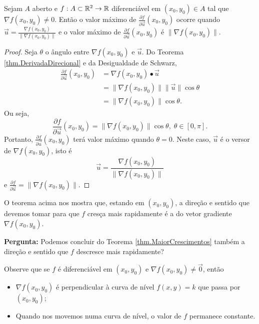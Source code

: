 \begin{theorem}\label{thm.MaiorCrescimentos}
    Sejam \(A\) aberto e \(f: A \subset \mathbb{R}^2 \to \mathbb{R}\) diferenciável em \((x_0,y_0)\in A\) tal que \(\nabla f(x_0,y_0)\neq 0\). Então o valor máximo de \(\frac{\partial f}{\partial \overrightarrow{u}}(x_0,y_0)\) ocorre quando \(\overrightarrow{u} = \frac{\nabla f(x_0,y_0)}{\|\nabla f(x_0,y_0)\|}\) e o valor máximo de \(\frac{\partial f}{\partial\overrightarrow{u}}(x_0,y_0)\) é \(\|\nabla f(x_0,y_0)\|\).
\end{theorem}

\begin{proof}
    Seja \(\theta\) o ângulo entre \(\nabla f(x_0,y_0)\) e \(\overrightarrow{u}\). Do Teorema \ref{thm.DerivadaDirecional} e da Desigualdade de Schwarz,
        \begin{align*}
            \frac{\partial f}{\partial \overrightarrow{u}}(x_0,y_0) 
                & = \nabla f(x_0,y_0)\bullet\overrightarrow{u} \\
                & = \|\nabla f(x_0,y_0)\| \|\overrightarrow{u}\| \cos\theta \\
                & = \|\nabla f(x_0,y_0)\| \cos\theta.
        \end{align*}
    Ou seja, \[\frac{\partial f}{\partial \overrightarrow{u}}(x_0,y_0) = \|\nabla f(x_0,y_0)\| \cos\theta,\; \theta\in[0,\pi].\] Portanto, \(\frac{\partial f}{\partial \overrightarrow{u}}(x_0,y_0)\) terá valor máximo quando \(\theta = 0\). Neste caso, \(\overrightarrow{u}\) é o versor de \(\nabla f(x_0,y_0)\), isto é \[\overrightarrow{u} = \frac{\nabla f(x_0,y_0)}{\|\nabla f(x_0,y_0)\|}\] e \(\frac{\partial f}{\partial \overrightarrow{u}} = \|\nabla f(x_0,y_0)\|\).
\end{proof}

O teorema acima nos mostra que, estando em \((x_0,y_0)\), a direção e sentido que devemos tomar para que \(f\) cresça mais rapidamente é a do vetor gradiente \(\nabla f(x_0,y_0)\).

\textbf{Pergunta: } Podemos concluir do Teorema \ref{thm.MaiorCrescimentos} também a direção e sentido que \(f\) descresce mais rapidamente?

Observe que se \(f\) é diferenciável em \((x_0,y_0)\) e \(\nabla f(x_0,y_0)\neq\overrightarrow{0}\), então
    \begin{itemize}
        \item \(\nabla f(x_0,y_0)\) é perpendicular à curva de nível \(f(x,y) = k\) que passa por \((x_0,y_0)\);
        \item Quando nos movemos numa curva de nível, o valor de \(f\) permanece constante.
    \end{itemize}

